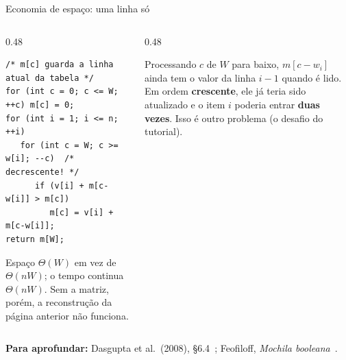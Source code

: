 \documentclass[aspectratio=169,xcolor=table]{beamer}
\newcommand{\fonte}[1]{%
  \vfill
  {\tiny\color{gray!55!black}\textbf{Para aprofundar:} #1\par}%
}
\begin{document}
\begin{frame}[fragile]{Economia de espaço: uma linha só}
  \begin{columns}[c]
    \begin{column}{0.48\textwidth}
\begin{lstlisting}[basicstyle=\ttfamily\tiny]
/* m[c] guarda a linha atual da tabela */
for (int c = 0; c <= W; ++c) m[c] = 0;
for (int i = 1; i <= n; ++i)
   for (int c = W; c >= w[i]; --c)  /* decrescente! */
      if (v[i] + m[c-w[i]] > m[c])
         m[c] = v[i] + m[c-w[i]];
return m[W];
\end{lstlisting}
      \scriptsize Espaço $\Theta(W)$ em vez de $\Theta(nW)$; o tempo continua $\Theta(nW)$.
      Sem a matriz, porém, a reconstrução da página anterior não funciona.
    \end{column}
    \begin{column}{0.48\textwidth}
      \centering
      \medskip

      \scriptsize Processando $c$ de $W$ para baixo, $m[c-w_i]$ ainda tem o valor da linha
      $i-1$ quando é lido. Em ordem \textbf{crescente}, ele já teria sido atualizado
      e o item $i$ poderia entrar \textbf{duas vezes}. Isso é outro problema (o desafio do
      tutorial).
    \end{column}
  \end{columns}
  \fonte{Dasgupta et al.\ (2008), \S 6.4~\cite{dasgupta2008algorithms};
    Feofiloff, \emph{Mochila booleana}~\cite{feofiloff2015mochila}.}
\end{frame}
\end{document}
